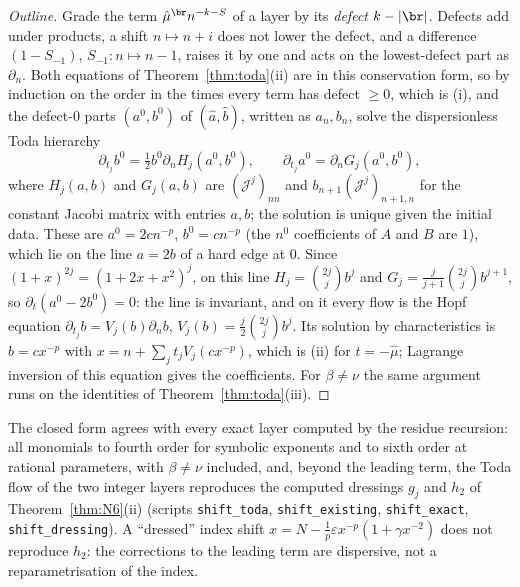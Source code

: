 \begin{proof}[Outline]
Grade the term $\hat\mu^{\br}n^{-k-S}$ of a layer by its \emph{defect} $k-|\br|$. Defects add under products, a shift $n\mapsto n+i$
does not lower the defect, and a difference $(1-S_{-1})$, $S_{-1}\colon n\mapsto n-1$, raises it by one and acts on the lowest-defect part
as $\partial_n$. Both equations of Theorem~\ref{thm:toda}(ii) are in this conservation form, so by induction on the order in the times
every term has defect $\ge0$, which is (i), and the defect-$0$ parts $(a^0,b^0)$ of $(\hat a,\hat b)$, written as $a_n,b_n$, solve the
dispersionless Toda hierarchy
\[
  \partial_{t_j}b^0=\tfrac12b^0\partial_nH_j(a^0,b^0),\qquad\partial_{t_j}a^0=\partial_nG_j(a^0,b^0),
\]
where $H_j(a,b)$ and $G_j(a,b)$ are $(\mathcal J^j)_{nn}$ and $b_{n+1}(\mathcal J^j)_{n+1,n}$ for the constant Jacobi matrix with entries
$a,b$; the solution is unique given the initial data. These are $a^0=2cn^{-p}$, $b^0=cn^{-p}$ (the $n^0$ coefficients of $A$ and $B$
are $1$), which lie on the line $a=2b$ of a hard edge at $0$. Since $(1+x)^{2j}=(1+2x+x^2)^j$, on this line
$H_j=\binom{2j}jb^j$ and $G_j=\frac j{j+1}\binom{2j}jb^{j+1}$, so $\partial_t(a^0-2b^0)=0$: the line is invariant, and on it every flow is
the Hopf equation $\partial_{t_j}b=V_j(b)\partial_nb$, $V_j(b)=\frac j2\binom{2j}jb^j$. Its solution by characteristics is $b=cx^{-p}$
with $x=n+\sum_jt_jV_j(cx^{-p})$, which is (ii) for $t=-\hat\mu$; Lagrange inversion of this equation gives the coefficients. For $\beta\ne\nu$ the same argument runs on the
identities of Theorem~\ref{thm:toda}(iii).
\end{proof}

The closed form agrees with every exact layer computed by the residue recursion: all monomials to fourth order for symbolic
exponents and to sixth order at rational parameters, with $\beta\ne\nu$ included, and, beyond the leading term, the Toda flow of the two
integer layers reproduces the computed dressings $g_j$ and $h_2$ of Theorem~\ref{thm:N6}(ii) (scripts \texttt{shift\_toda},
\texttt{shift\_existing}, \texttt{shift\_exact}, \texttt{shift\_dressing}). A ``dressed'' index shift $x=N-\frac1p\varepsilon x^{-p}(1+\gamma x^{-2})$
does not reproduce $h_2$: the corrections to the leading term are dispersive, not a reparametrisation of the index.

